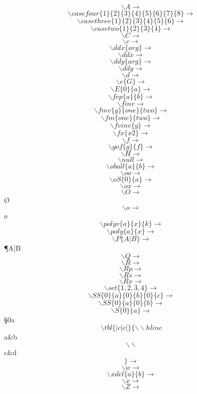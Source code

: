\documentclass{article} %
\begin{document}
\[{\backslash}A \to\]\A
\[{\backslash}casefour\{1\}\{2\}\{3\}\{4\}\{5\}\{6\}\{7\}\{8\} \to\]
\[{\backslash}casethree\{1\}\{2\}\{3\}\{4\}\{5\}\{6\} \to\]
\[{\backslash}casetwo\{1\}\{2\}\{3\}\{4\} \to\]
\[{\backslash}C \to\]\C
\[{\backslash}c \to\]\c
\[{\backslash}ddx\{arg\} \to\]
\[{\backslash}ddx \to\]\ddx
\[{\backslash}ddy\{arg\} \to\]
\[{\backslash}ddy \to\]\ddy
\[{\backslash}d\to\] \d
\[{\backslash}e\{G\} \to\]
\[{\backslash}E\{0\}\{a\}\to\] 
\[{\backslash}fep\{a\}\{b\} \to\]
\[{\backslash}finv \to\]\finv
\[{\backslash}fmv\{g\}\{one\}\{two\} \to\]
\[{\backslash}fm\{one\}\{two\} \to\]
\[{\backslash}fvinv\{g\} \to\]
\[{\backslash}fx\{x\hat{}2\}\to\]
\[{\backslash}f \to\]\f
\[{\backslash}gof\{g\}\{f\} \to\]
\[{\backslash}H \to\]\H
\[{\backslash}null \to\]\null
\[{\backslash}oball\{a\}\{b\} \to\]
\[{\backslash}oo\to\] \oo
\[{\backslash}oS\{0\}\{a\}\to\] 
\[{\backslash}ox\to\] \ox
\[{\backslash}O \to\] \O
\[{\backslash}o \to\] \o
\[{\backslash}polyv\{a\}\{x\}\{k\} \to\] 
\[{\backslash}poly\{a\}\{x\} \to\] 
\[{\backslash}P\{A|B\}\to\] \P{A|B}
\[{\backslash}Q \to\]\Q
\[{\backslash}R \to\] \R
\[{\backslash}Rp \to\] \Rp
\[{\backslash}Rs \to\] \Rs
\[{\backslash}Rx \to\] \Rx
\[{\backslash}set\{1,2,3,4\} \to\]
\[{\backslash}SS\{0\}\{a\}\{0\}\{b\}\{0\}\{c\}\to\] 
\[{\backslash}SS\{0\}\{a\}\{0\}\{b\}\to\] 
\[{\backslash}S\{0\}\{a\}\to\] \S{0}{a}
\[{\backslash}tbl\{|c|c|\}\{{\backslash}{\backslash} hline\] a\&b \[{\backslash}{\backslash}\] c\&d\[\} \to\]
\[{\backslash}w\to\] \w
\[{\backslash}xdel\{a\}\{b\} \to\]
\[{\backslash}x\to\] \x
\[{\backslash}Z \to\]\Z
\end{document}
